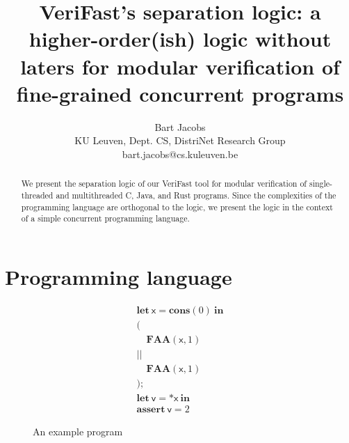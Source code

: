 \documentclass{article}
\title{VeriFast's separation logic: a higher-order(ish) logic without laters for modular verification of fine-grained concurrent programs}
\author{Bart Jacobs\\
{\small KU Leuven, Dept. CS, DistriNet Research Group}\\
{\small \textsf{bart.jacobs@cs.kuleuven.be}}}
\begin{document}
\maketitle

\begin{abstract}
We present the separation logic of our VeriFast tool for modular verification of single-threaded and multithreaded C, Java, and Rust programs. Since the complexities of the programming language are orthogonal to the logic, we present the logic in the context of a simple concurrent programming language.
\end{abstract}

\section{Programming language}

\begin{figure}
$$\begin{array}{l}
\mathbf{let}\ \mathsf{x} = \mathbf{cons}(0)\ \mathbf{in}\\
(\\
\quad \mathbf{FAA}(\mathsf{x}, 1)\\
||\\
\quad \mathbf{FAA}(\mathsf{x}, 1)\\
);\\
\mathbf{let}\ \mathsf{v} = {*}\mathsf{x}\ \mathbf{in}\\
\mathbf{assert}\ \mathsf{v} = 2
\end{array}$$
\caption{An example program}\label{fig:example}
\end{figure}
\end{document}
